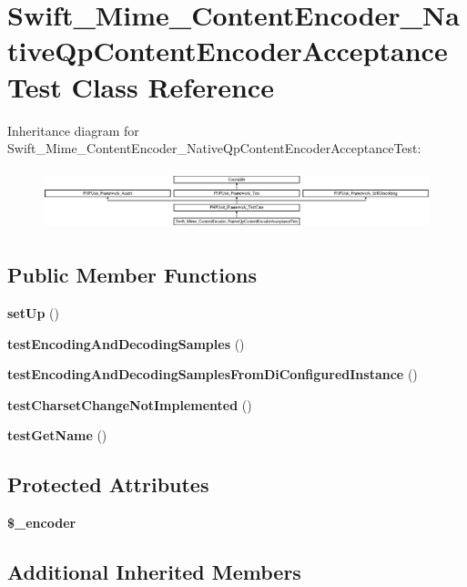 \section{Swift\+\_\+\+Mime\+\_\+\+Content\+Encoder\+\_\+\+Native\+Qp\+Content\+Encoder\+Acceptance\+Test Class Reference}
\label{class_swift___mime___content_encoder___native_qp_content_encoder_acceptance_test}
Inheritance diagram for Swift\+\_\+\+Mime\+\_\+\+Content\+Encoder\+\_\+\+Native\+Qp\+Content\+Encoder\+Acceptance\+Test\+:\begin{figure}[H]
\begin{center}
\leavevmode
\includegraphics[height=1.761006cm]{class_swift___mime___content_encoder___native_qp_content_encoder_acceptance_test}
\end{center}
\end{figure}
\subsection*{Public Member Functions}
\begin{DoxyCompactItemize}
\item 
{\bf set\+Up} ()
\item 
{\bf test\+Encoding\+And\+Decoding\+Samples} ()
\item 
{\bf test\+Encoding\+And\+Decoding\+Samples\+From\+Di\+Configured\+Instance} ()
\item 
{\bf test\+Charset\+Change\+Not\+Implemented} ()
\item 
{\bf test\+Get\+Name} ()
\end{DoxyCompactItemize}
\subsection*{Protected Attributes}
\begin{DoxyCompactItemize}
\item 
{\bf \$\+\_\+encoder}
\end{DoxyCompactItemize}
\subsection*{Additional Inherited Members}


